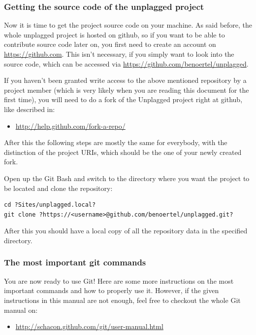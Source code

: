 \subsubsection{Getting the source code of the unplagged project}
Now it is time to get the project source code on your machine. As said before, the whole unplagged project is hosted on 
github, so if you want to be able to contribute source code later on, you first need to create an account on \url{https://github.com}.
This isn't necessary, if you simply want to look into the source code, which can be accessed via \url{https://github.com/benoertel/unplagged}.

If you haven't been granted write access to the above mentioned repository by a project member (which is very likely when
you are reading this document for the first time), you will need to do a fork
of the Unplagged project right at github, like described in:

\begin{itemize}
\item \url{http://help.github.com/fork-a-repo/}
\end{itemize}

After this the following steps are mostly the same for everybody, with the distinction of the project URIs, which should 
be the one of 
your newly created fork.

Open up the Git Bash and switch to the directory where you want the project to be 
located and clone the repository:

\begin{lstlisting}[caption=Cloning a repository]
cd ?Sites/unplagged.local?
git clone ?https://<username>@github.com/benoertel/unplagged.git?
\end{lstlisting}

After this you should have a local copy of all the repository data in the specified directory.

\subsubsection{The most important git commands}

You are now ready to use Git! Here are some more instructions on the most important commands and how to properly use it. 
However, if the given instructions in this manual are not enough, feel free to checkout the whole Git manual on: 

\begin{itemize}
\item \url{http://schacon.github.com/git/user-manual.html}
\end{itemize}

